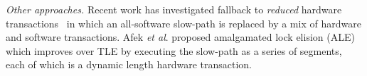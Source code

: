 \vspace{1mm}\noindent\textit{Other approaches.}
Recent work has investigated fallback to \emph{reduced} hardware transactions~\cite{MS13}
in which an all-software slow-path is replaced by a mix of hardware and software transactions. 
Afek \emph{et al}. proposed amalgamated lock elision (ALE)~\cite{ale15} which improves over TLE
by executing the slow-path as a series of segments, each of which is a dynamic length hardware transaction.
